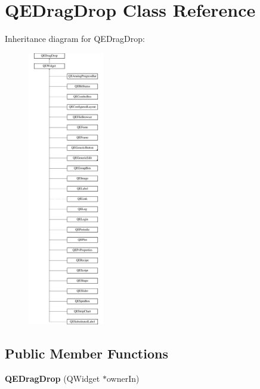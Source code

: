 \hypertarget{classQEDragDrop}{
\section{QEDragDrop Class Reference}
\label{classQEDragDrop}
}
Inheritance diagram for QEDragDrop:\begin{figure}[H]
\begin{center}
\leavevmode
\includegraphics[height=12.000000cm]{classQEDragDrop}
\end{center}
\end{figure}
\subsection*{Public Member Functions}
\begin{DoxyCompactItemize}
\item 
\hypertarget{classQEDragDrop_a51119e411bb5e269c4f9948b602a9ae1}{
{\bfseries QEDragDrop} (QWidget $\ast$ownerIn)}
\label{classQEDragDrop_a51119e411bb5e269c4f9948b602a9ae1}

\end{DoxyCompactItemize}
